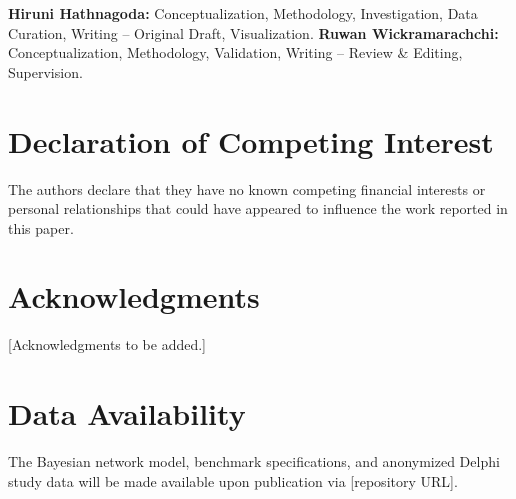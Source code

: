 \documentclass[preprint,review,12pt]{elsarticle}
\begin{document}
\textbf{Hiruni Hathnagoda:} Conceptualization, Methodology, Investigation, Data Curation, Writing -- Original Draft, Visualization. \textbf{Ruwan Wickramarachchi:} Conceptualization, Methodology, Validation, Writing -- Review \& Editing, Supervision.

\section*{Declaration of Competing Interest}

The authors declare that they have no known competing financial interests or personal relationships that could have appeared to influence the work reported in this paper.

\section*{Acknowledgments}

[Acknowledgments to be added.]

\section*{Data Availability}

The Bayesian network model, benchmark specifications, and anonymized Delphi study data will be made available upon publication via [repository URL].


\end{document}
